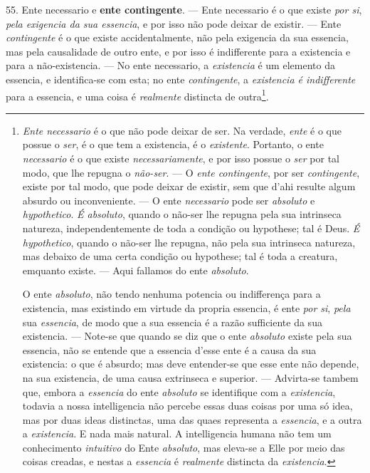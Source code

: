 55. Ente necessario e \textbf{ente contingente}. --- Ente necessario é o que existe \emph{por si}, \emph{pela exigencia da sua essencia}, e por isso não pode deixar de existir. --- Ente \emph{contingente} é o que existe accidentalmente, não pela exigencia da sua essencia, mas pela causalidade de outro ente, e por isso é indifferente para a    existencia e para a não-existencia. --- No ente necessario, a \emph{existencia} é um elemento da essencia, e identifica-se com esta; no ente \emph{contingente}, a \emph{existencia é indifferente} para a essencia, e uma coisa é \emph{realmente} distincta de outra\footnote{\emph{Ente necessario} é o que não pode deixar de ser. Na verdade, \emph{ente} é o que possue o \emph{ser}, é o que tem a existencia, é o \emph{existente}. Portanto, o ente \emph{necessario} é o que existe \emph{necessariamente}, e por isso possue o \emph{ser} por tal modo, que lhe repugna o \emph{não-ser}. --- O \emph{ente contingente}, por ser \emph{contingente}, existe por tal modo, que pode deixar de existir, sem que d'ahi resulte algum absurdo ou inconveniente. --- O ente \emph{necessario} pode ser \emph{absoluto} e \emph{hypothetico}. \emph{É absoluto}, quando o não-ser lhe repugna pela sua intrinseca natureza, independentemente de toda a condição ou hypothese; tal é Deus. \emph{É hypothetico}, quando o não-ser lhe repugna, não pela sua intrinseca natureza, mas debaixo de uma certa condição ou hypothese; tal é toda a creatura, emquanto existe. --- Aqui fallamos do ente \emph{absoluto}.\par O ente \emph{absoluto}, não tendo nenhuma potencia ou indifferença para a existencia, mas existindo em virtude da propria essencia, é ente \emph{por si}, \emph{pela} sua \emph{essencia}, de modo que a sua essencia é a razão sufficiente da sua existencia. --- Note-se que quando se diz que o ente \emph{absoluto} existe pela sua essencia, não se entende que a essencia d'esse ente é a causa da sua existencia: o que é absurdo; mas deve entender-se que esse ente não depende, na sua existencia, de uma causa extrinseca e superior. --- Advirta-se tambem que, embora a \emph{essencia} do ente \emph{absoluto} se identifique com a \emph{existencia}, todavia a nossa intelligencia não percebe essas duas coisas por uma só idea, mas por duas ideas distinctas, uma das quaes representa a \emph{essencia}, e a outra a \emph{existencia}. E nada mais natural. A intelligencia humana não tem um conhecimento \emph{intuitivo} do Ente \emph{absoluto}, mas eleva-se a Elle por meio das coisas creadas, e nestas a \emph{essencia} é \emph{realmente} distincta da \emph{existencia}.}.

